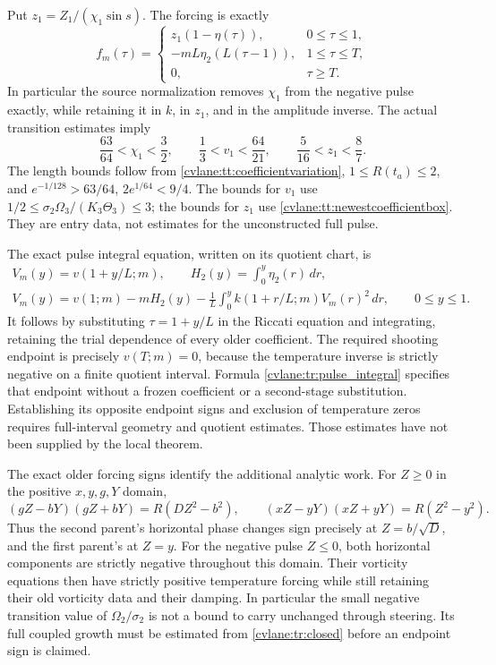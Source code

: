 Put $z_1=Z_1/(\chi_1\sin s)$. The forcing is exactly
\begin{equation}\label{cvlane:tr:forcing}
 f_m(\tau)=
 \begin{cases}
 z_1(1-\eta(\tau)),&0\leq\tau\leq1,\\
 -mL\eta_2(L(\tau-1)),&1\leq\tau\leq T,\\
 0,&\tau\geq T.
 \end{cases}
\end{equation}
In particular the source normalization removes $\chi_1$ from the
negative pulse exactly, while retaining it in $k$, in $z_1$, and in
the amplitude inverse. The actual transition estimates imply
\[
 \frac{63}{64}<\chi_1<\frac32,\qquad
 \frac13<v_1<\frac{64}{21},\qquad
 \frac5{16}<z_1<\frac87.
\]
The length bounds follow from \eqref{cvlane:tt:coefficientvariation},
$1\leq R(t_a)\leq2$, and
$e^{-1/128}>63/64$, $2e^{1/64}<9/4$.
The bounds for $v_1$ use $1/2\leq\sigma_2\Omega_3/(K_3\Theta_3)\leq3$;
the bounds for $z_1$ use \eqref{cvlane:tt:newestcoefficientbox}.
They are entry data, not estimates for the unconstructed full pulse.

The exact pulse integral equation, written on its quotient chart,
is
\begin{equation}\label{cvlane:tr:pulse_integral}
 \begin{gathered}
 V_m(y)=v(1+y/L;m),\qquad
 H_2(y)=\int_0^y\eta_2(r)\,dr,\\
 V_m(y)=v(1;m)-mH_2(y)
       -\frac1L\int_0^y k(1+r/L;m)V_m(r)^2\,dr,
 \qquad 0\leq y\leq1.
 \end{gathered}
\end{equation}
It follows by substituting $\tau=1+y/L$ in the Riccati equation
and integrating, retaining the trial dependence of every older
coefficient. The required shooting endpoint is precisely $v(T;m)=0$,
because the temperature inverse is strictly negative on a finite
quotient interval. Formula \eqref{cvlane:tr:pulse_integral} specifies that
endpoint without a frozen coefficient or a second-stage substitution.
Establishing its opposite endpoint signs and exclusion of temperature
zeros requires full-interval geometry and quotient estimates.
Those estimates have not been supplied by the local theorem.

The exact older forcing signs identify the additional analytic work.
For $Z\geq0$ in the positive $x,y,g,Y$ domain,
\[
 (gZ-bY)(gZ+bY)=R(DZ^2-b^2),\qquad
 (xZ-yY)(xZ+yY)=R(Z^2-y^2).
\]
Thus the second parent's horizontal phase changes sign precisely at
$Z=b/\sqrt D$, and the first parent's at $Z=y$.
For the negative pulse $Z\leq0$, both horizontal components are
strictly negative throughout this domain. Their vorticity equations
then have strictly positive temperature forcing while still retaining
their old vorticity data and their damping. In particular the small
negative transition value of $\Omega_2/\sigma_2$ is not a bound
to carry unchanged through steering. Its full coupled growth must be
estimated from \eqref{cvlane:tr:closed} before an endpoint sign is claimed.

